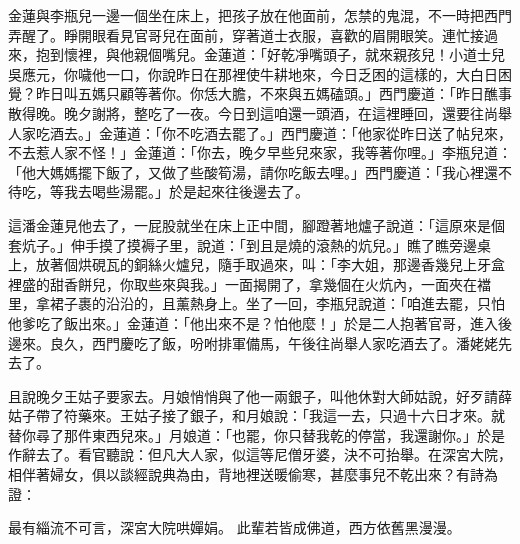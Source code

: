 金蓮與李瓶兒一邊一個坐在床上，把孩子放在他面前，怎禁的鬼混，不一時把西門弄醒了。睜開眼看見官哥兒在面前，穿著道士衣服，喜歡的眉開眼笑。連忙接過來，抱到懷裡，與他親個嘴兒。金蓮道：「好乾凈嘴頭子，就來親孩兒！小道士兒吳應元，你噦他一口，你說昨日在那裡使牛耕地來，今日乏困的這樣的，大白日困覺？昨日叫五媽只顧等著你。你恁大膽，不來與五媽磕頭。」西門慶道：「昨日醮事散得晚。晚夕謝將，整吃了一夜。今日到這咱還一頭酒，在這裡睡回，還要往尚舉人家吃酒去。」金蓮道：「你不吃酒去罷了。」西門慶道：「他家從昨日送了帖兒來，不去惹人家不怪！」金蓮道：「你去，晚夕早些兒來家，我等著你哩。」李瓶兒道：「他大媽媽擺下飯了，又做了些酸筍湯，請你吃飯去哩。」西門慶道：「我心裡還不待吃，等我去喝些湯罷。」於是起來往後邊去了。

這潘金蓮見他去了，一屁股就坐在床上正中間，腳蹬著地爐子說道：「這原來是個套炕子。」伸手摸了摸褥子里，說道：「到且是燒的滾熱的炕兒。」瞧了瞧旁邊桌上，放著個烘硯瓦的銅絲火爐兒，隨手取過來，叫：「李大姐，那邊香幾兒上牙盒裡盛的甜香餅兒，你取些來與我。」一面揭開了，拿幾個在火炕內，一面夾在襠里，拿裙子裹的沿沿的，且薰熱身上。坐了一回，李瓶兒說道：「咱進去罷，只怕他爹吃了飯出來。」金蓮道：「他出來不是？怕他麼！」於是二人抱著官哥，進入後邊來。良久，西門慶吃了飯，吩咐排軍備馬，午後往尚舉人家吃酒去了。潘姥姥先去了。

且說晚夕王姑子要家去。月娘悄悄與了他一兩銀子，叫他休對大師姑說，好歹請薛姑子帶了符藥來。王姑子接了銀子，和月娘說：「我這一去，只過十六日才來。就替你尋了那件東西兒來。」月娘道：「也罷，你只替我乾的停當，我還謝你。」於是作辭去了。看官聽說：但凡大人家，似這等尼僧牙婆，決不可抬舉。在深宮大院，相伴著婦女，俱以談經說典為由，背地裡送暖偷寒，甚麼事兒不乾出來？有詩為證：

最有緇流不可言，深宮大院哄嬋娟。
此輩若皆成佛道，西方依舊黑漫漫。

